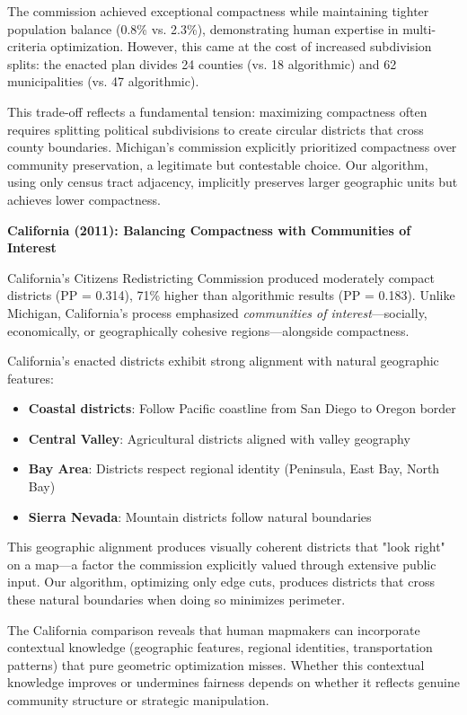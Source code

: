 The commission achieved exceptional compactness while maintaining tighter population balance (0.8\% vs. 2.3\%), demonstrating human expertise in multi-criteria optimization. However, this came at the cost of increased subdivision splits: the enacted plan divides 24 counties (vs. 18 algorithmic) and 62 municipalities (vs. 47 algorithmic).

This trade-off reflects a fundamental tension: maximizing compactness often requires splitting political subdivisions to create circular districts that cross county boundaries. Michigan's commission explicitly prioritized compactness over community preservation, a legitimate but contestable choice. Our algorithm, using only census tract adjacency, implicitly preserves larger geographic units but achieves lower compactness.

\textbf{California (2011): Balancing Compactness with Communities of Interest}

California's Citizens Redistricting Commission produced moderately compact districts (PP = 0.314), 71\% higher than algorithmic results (PP = 0.183). Unlike Michigan, California's process emphasized \textit{communities of interest}—socially, economically, or geographically cohesive regions—alongside compactness.

California's enacted districts exhibit strong alignment with natural geographic features:
\begin{itemize}
\item \textbf{Coastal districts}: Follow Pacific coastline from San Diego to Oregon border
\item \textbf{Central Valley}: Agricultural districts aligned with valley geography
\item \textbf{Bay Area}: Districts respect regional identity (Peninsula, East Bay, North Bay)
\item \textbf{Sierra Nevada}: Mountain districts follow natural boundaries
\end{itemize}

This geographic alignment produces visually coherent districts that "look right" on a map—a factor the commission explicitly valued through extensive public input. Our algorithm, optimizing only edge cuts, produces districts that cross these natural boundaries when doing so minimizes perimeter.

The California comparison reveals that human mapmakers can incorporate contextual knowledge (geographic features, regional identities, transportation patterns) that pure geometric optimization misses. Whether this contextual knowledge improves or undermines fairness depends on whether it reflects genuine community structure or strategic manipulation.

